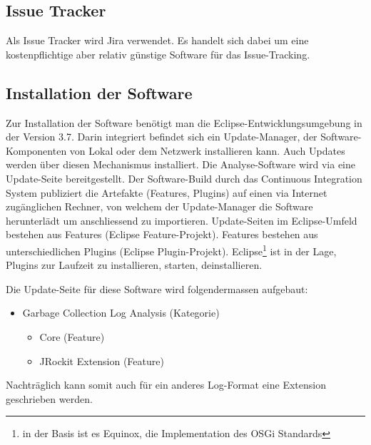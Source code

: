 \subsection{Issue Tracker}
Als Issue Tracker wird Jira verwendet. Es handelt sich dabei um eine kostenpflichtige aber relativ günstige Software für das Issue-Tracking.

\subsection{Installation der Software}\label{installation}
Zur Installation der Software benötigt man die Eclipse-Entwicklungsumgebung in der Version 3.7. Darin integriert befindet sich ein Update-Manager, der Software-Komponenten von Lokal oder dem Netzwerk installieren kann. Auch Updates werden über diesen Mechanismus installiert. Die Analyse-Software wird via eine Update-Seite bereitgestellt. Der Software-Build durch das Continuous Integration System publiziert die Artefakte (Features, Plugins) auf einen via Internet zugänglichen Rechner, von welchem der Update-Manager die Software herunterlädt um anschliessend zu importieren. Update-Seiten im Eclipse-Umfeld bestehen aus Features (Eclipse Feature-Projekt). Features bestehen aus unterschiedlichen Plugins (Eclipse Plugin-Projekt). Eclipse\footnote{in der Basis ist es Equinox, die Implementation des OSGi Standards} ist in der Lage, Plugins zur Laufzeit zu installieren, starten, deinstallieren.

Die Update-Seite für diese Software wird folgendermassen aufgebaut:
\begin{itemize}
	\item Garbage Collection Log Analysis (Kategorie)
		\begin{itemize}
			\item Core (Feature)
			\item JRockit Extension (Feature)
		\end{itemize}
\end{itemize}
Nachträglich kann somit auch für ein anderes Log-Format eine Extension geschrieben werden.


